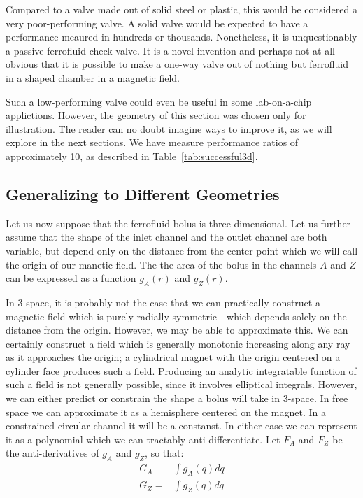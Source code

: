 \documentclass{asme2ej}
\begin{document}
Compared to a valve made out of solid steel or plastic, this would be considered
a very poor-performing valve. A solid valve would be expected to have a performance
meaured in hundreds or thousands.
Nonetheless, it is unquestionably a
passive ferrofluid check valve.
It is a novel invention and perhaps not at all obvious that it is possible to make
a one-way valve out of nothing but ferrofluid in a shaped chamber in a magnetic field.

Such a low-performing valve could even be useful in some lab-on-a-chip applictions.
However, the geometry of this section was chosen only for illustration.
The reader can no doubt imagine ways to improve it, as we will explore in the
next sections.
We have measure performance ratios of approximately 10, as described
in Table~\ref{tab:successful3d}.




\subsection{Generalizing to Different Geometries}

Let us now suppose that the ferrofluid bolus is three dimensional.
Let us further assume that the shape of the inlet channel and
the outlet channel are both variable, but depend only on the distance
from the center point which we will call the origin of our manetic
field.
The the area of the bolus in the channels $A$ and $Z$ can be expressed
as a function $g_A(r)$ and $g_Z(r)$.

In 3-space, it is probably not the case that we can practically construct a
magnetic field which is purely radially symmetric---which depends solely on
the distance from the origin. However, we may be able to
approximate this. We can certainly construct a field which is
generally monotonic increasing along any ray as it approaches the origin;
a cylindrical magnet with the origin centered on a cylinder face produces
such a field. Producing an analytic integratable function of such
a field is not generally possible, since it involves elliptical integrals.
However, we can either predict or constrain the shape a bolus will take
in 3-space. In free space we can approximate it as a hemisphere centered
on the magnet. In a constrained circular channel it will be a constanst.
In either case we can represent it as a polynomial which we can
tractably anti-differentiate. Let $F_A$ and $F_Z$ be the anti-derivatives
of $g_A$ and $g_Z$, so that:
\begin{align}
  G_A &\int g_A(q) dq \\
  G_Z = & \int g_Z(q) dq \\
\end{align}
\end{document}
